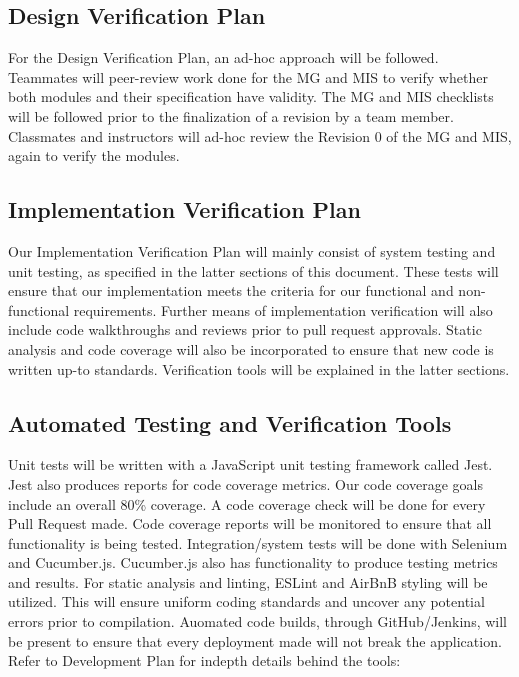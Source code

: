 \documentclass[12pt, titlepage]{article}
\begin{document}
\subsection{Design Verification Plan}
For the Design Verification Plan, an ad-hoc approach will be followed. Teammates will peer-review work done for the MG and MIS to verify whether both modules and their specification have validity. The MG and MIS checklists will be followed prior to the finalization of a revision by a team member. Classmates and instructors will ad-hoc review the Revision 0 of the MG and MIS, again to verify the modules. 

\subsection{Implementation Verification Plan}
Our Implementation Verification Plan will mainly consist of system testing and unit testing, as specified in the latter sections of this document. These tests will ensure that our implementation meets the criteria for our functional and non-functional requirements.
Further means of implementation verification will also include code walkthroughs and reviews prior to pull request approvals. Static analysis and code coverage will also be incorporated to ensure that new code is written up-to standards. Verification tools will be explained in the latter sections.


\subsection{Automated Testing and Verification Tools}
Unit tests will be written with a JavaScript unit testing framework called Jest. Jest also produces reports for code coverage metrics. Our code coverage goals include an overall 80\% coverage. A code coverage check will be done for every Pull Request made. Code coverage reports will be monitored to ensure that all functionality is being tested. Integration/system tests will be done with Selenium and Cucumber.js. Cucumber.js also has functionality to produce testing metrics and results. For static analysis and linting, ESLint and AirBnB styling will be utilized. This will ensure uniform coding standards and uncover any potential errors prior to compilation. Auomated code builds, through GitHub/Jenkins, will be present to ensure that every deployment made will not break the application. Refer to Development Plan for indepth details behind the tools:

\citet{DevPlan}
\end{document}
